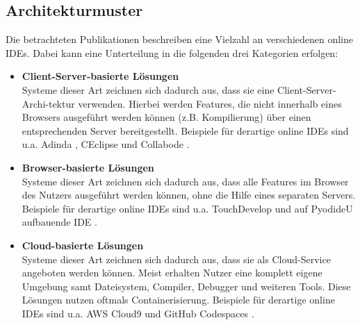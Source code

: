 \subsection{Architekturmuster}\label{section:stand-der-technik:literaturrecherche:architekturmuster}

Die betrachteten Publikationen beschreiben eine Vielzahl an verschiedenen online IDEs. Dabei kann eine Unterteilung in die folgenden drei Kategorien erfolgen:

\begin{itemize}
      \item \textbf{Client-Server-basierte Lösungen} \\
            Systeme dieser Art zeichnen sich dadurch aus, dass sie eine Client-Server-Archi-tektur verwenden. Hierbei werden Features, die nicht innerhalb eines Browsers ausgeführt werden können (z.B. Kompilierung) über einen entsprechenden Server bereitgestellt. Beispiele für derartige online IDEs sind u.a. Adinda \cite{van_deursen_adinda_2010}, CEclipse \cite{wu_ceclipse_2011} und Collabode \cite{goldman_real-time_2011}.
      \item \textbf{Browser-basierte Lösungen} \\
            Systeme dieser Art zeichnen sich dadurch aus, dass alle Features im Browser des Nutzers ausgeführt werden können, ohne die Hilfe eines separaten Servers. Beispiele für derartige online IDEs sind u.a. TouchDevelop \cite{ball_beyond_2015} und auf PyodideU aufbauende IDE \cite{jefferson_pyodideu_2024}.
      \item \textbf{Cloud-basierte Lösungen} \\
            Systeme dieser Art zeichnen sich dadurch aus, dass sie als Cloud-Service angeboten werden können. Meist erhalten Nutzer eine komplett eigene Umgebung samt Dateisystem, Compiler, Debugger und weiteren Tools. Diese Lösungen nutzen oftmals Containerisierung. Beispiele für derartige online IDEs sind u.a. AWS Cloud9 \cite{noauthor_aws-cloud9_nodate} und GitHub Codespaces \cite{noauthor_github-codespaces_2024}.
\end{itemize}